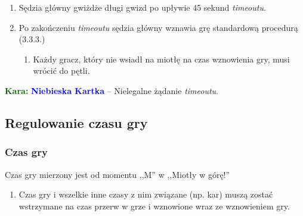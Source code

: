 \documentclass[11pt,a4paper]{article}
\newcommand\bluecard[1]{\bgroup\textcolor{darkgreen}{\textbf{Kara: }}\bgroup\textcolor{blue}{\textbf{Niebieska Kartka}} -- #1}
\begin{document}
\begin{enumerate}
\begin{enumerate}
    \item Sędzia główny gwiżdże długi gwizd po upływie 45 sekund \emph{timeoutu}.
    \item Po zakończeniu \emph{timeoutu} sędzia główny wznawia grę standardową procedurą (3.3.3.) %
    \begin{enumerate}
      \item Każdy gracz, który nie wsiadł na miotłę na czas wznowienia gry, musi wrócić do pętli.
    \end{enumerate}
  \end{enumerate}
\end{enumerate}

\bluecard{Nielegalne żądanie \emph{timeoutu}.}

\subsection{Regulowanie czasu gry}

\subsubsection{Czas gry}
Czas gry mierzony jest od momentu ,,M'' w ,,Miotły w górę!''
\begin{enumerate}
  \item Czas gry i wszelkie inne czasy z nim związane (np. kar) muszą zostać wstrzymane na czas przerw w grze i wznowione wraz ze wznowieniem gry.
\end{enumerate}
\end{document}
